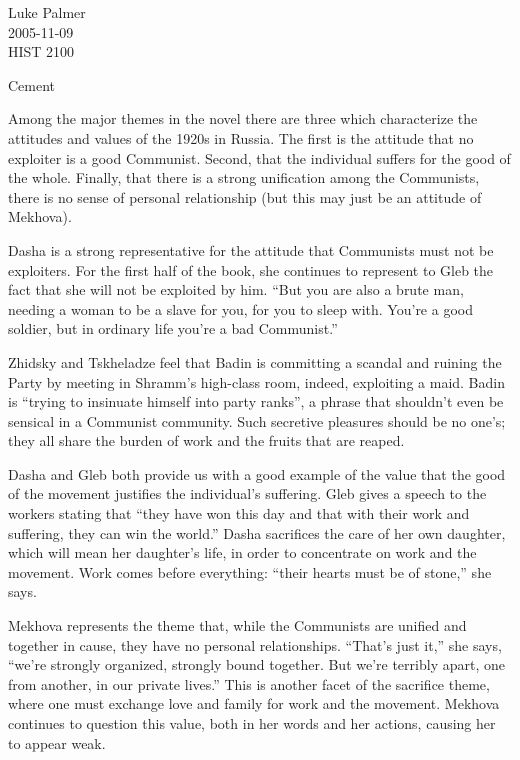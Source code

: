 \documentclass[12pt]{article}
\begin{document}
\noindent Luke Palmer \\
2005-11-09 \\
HIST 2100

\begin{center}
\Huge{Cement}
\end{center}

\doublespace

Among the major themes in the novel there are three which characterize
the attitudes and values of the 1920s in Russia.  The first is the
attitude that no exploiter is a good Communist.  Second, that the
individual suffers for the good of the whole.  Finally, that there is a
strong unification among the Communists, there is no sense of personal
relationship (but this may just be an attitude of Mekhova).

Dasha is a strong representative for the attitude that Communists must
not be exploiters.  For the first half of the book, she continues to
represent to Gleb the fact that she will not be exploited by him.  ``But
you are also a brute man, needing a woman to be a slave for you, for you
to sleep with.  You're a good soldier, but in ordinary life you're a bad
Communist.''   

Zhidsky and Tskheladze feel that Badin is committing a scandal and
ruining the Party by meeting in Shramm's high-class room, indeed,
exploiting a maid.  Badin is ``trying to insinuate himself into party
ranks'', a phrase that shouldn't even be sensical in a Communist
community. Such secretive pleasures should be no one's; they all share
the burden of work and the fruits that are reaped.

Dasha and Gleb both provide us with a good example of the value that the
good of the movement justifies the individual's suffering. Gleb gives a
speech to the workers stating that ``they have won this day and that
with their work and suffering, they can win the world.''  Dasha
sacrifices the care of her own daughter, which will mean her daughter's
life, in order to concentrate on work and the movement.  Work comes
before everything: ``their hearts must be of stone,'' she says.

Mekhova represents the theme that, while the Communists are unified and
together in cause, they have no personal relationships.  ``That's just
it,'' she says, ``we're strongly organized, strongly bound together.  But
we're terribly apart, one from another, in our private lives.''  This is
another facet of the sacrifice theme, where one must exchange love and
family for work and the movement.  Mekhova continues to question this
value, both in her words and her actions, causing her to appear weak.
\end{document}
